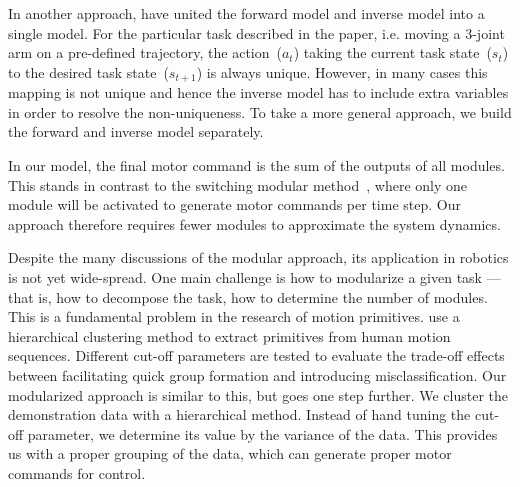 In another approach, \citet{petkos2006learning} have united the
forward model and inverse model into
a single model. For the particular task described in the paper, i.e. moving a 3-joint arm on a pre-defined trajectory,
the action~($a_t$) taking the current task state~($s_t$) to the
desired task state~($s_{t+1}$) is always unique. However, in many
cases this mapping is not unique and hence the inverse model has to
include extra variables in order to resolve the non-uniqueness. To
take a more general approach, we build the forward and inverse model
separately. %

In our model, the final motor command is the sum of the outputs of all
modules. This stands in contrast to the switching modular
method~\citep{narendra1997adaptive}, where only one module will be
activated to generate motor commands per time step.  Our approach therefore
requires fewer modules to approximate the system dynamics.

Despite the many discussions of the modular approach, its application
in robotics is not yet wide-spread. One main challenge is how to
modularize a given task --- that is, how to decompose the task,
how to determine the number of modules. This is a
fundamental problem in the research of motion
primitives. \citet{kulic2008incremental} use a hierarchical clustering
method to extract primitives from human motion sequences. Different
cut-off parameters are tested to evaluate the trade-off effects
between facilitating quick group formation and introducing
misclassification. Our modularized approach is similar to this, but
goes one step further. We cluster the demonstration data with a
hierarchical method. Instead of
hand tuning the cut-off parameter, we determine its value by the
variance of the data. This provides us with a proper grouping of the
data, which can generate proper motor commands for control.

